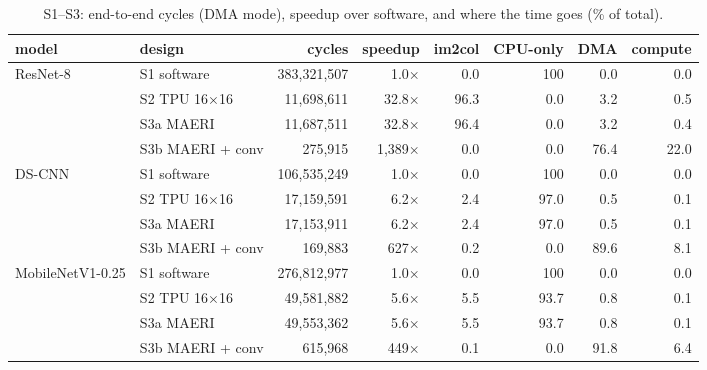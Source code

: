\begin{table}[t]\centering\footnotesize\setlength{\tabcolsep}{3pt}
\caption{S1--S3: end-to-end cycles (DMA mode), speedup over software, and where the time goes (\% of total).}\label{tab:e2e}
\begin{tabular}{@{}llrrrrrr@{}}\toprule
model & design & cycles & speedup & im2col & CPU-only & DMA & compute\\\midrule
ResNet-8 & S1 software & 383{,}321{,}507 & 1.0$\times$ & 0.0 & 100 & 0.0 & 0.0 \\
 & S2 TPU 16$\times$16 & 11{,}698{,}611 & 32.8$\times$ & 96.3 & 0.0 & 3.2 & 0.5 \\
 & S3a MAERI & 11{,}687{,}511 & 32.8$\times$ & 96.4 & 0.0 & 3.2 & 0.4 \\
 & S3b MAERI + conv & 275{,}915 & 1{,}389$\times$ & 0.0 & 0.0 & 76.4 & 22.0 \\
\midrule
DS-CNN & S1 software & 106{,}535{,}249 & 1.0$\times$ & 0.0 & 100 & 0.0 & 0.0 \\
 & S2 TPU 16$\times$16 & 17{,}159{,}591 & 6.2$\times$ & 2.4 & 97.0 & 0.5 & 0.1 \\
 & S3a MAERI & 17{,}153{,}911 & 6.2$\times$ & 2.4 & 97.0 & 0.5 & 0.1 \\
 & S3b MAERI + conv & 169{,}883 & 627$\times$ & 0.2 & 0.0 & 89.6 & 8.1 \\
\midrule
MobileNetV1-0.25 & S1 software & 276{,}812{,}977 & 1.0$\times$ & 0.0 & 100 & 0.0 & 0.0 \\
 & S2 TPU 16$\times$16 & 49{,}581{,}882 & 5.6$\times$ & 5.5 & 93.7 & 0.8 & 0.1 \\
 & S3a MAERI & 49{,}553{,}362 & 5.6$\times$ & 5.5 & 93.7 & 0.8 & 0.1 \\
 & S3b MAERI + conv & 615{,}968 & 449$\times$ & 0.1 & 0.0 & 91.8 & 6.4 \\
\bottomrule\end{tabular}\end{table}
